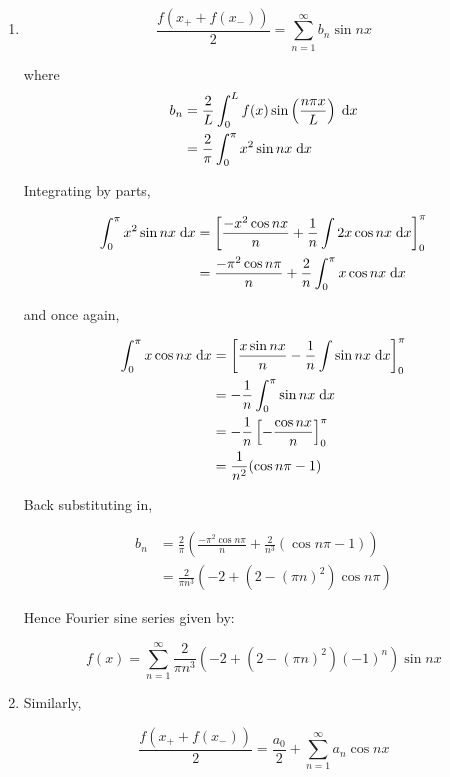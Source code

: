\documentclass[a4paper]{article}
\begin{document}
\begin{enumerate}[label = (\alph*)]
	\item \[ \frac{f(x_{+} + f(x_{-}))}{2} =  \sum_{n=1}^{\infty} b_{n} \sin  n x   \]
	
	where 
	\begin{align*}
	b_{n} & = \frac{2}{L} \int_{0}^{L} f(x) \sin \left( \frac{n \pi x}{L} \right) \; \mathrm{d} x  \\
	& = \frac{2}{\pi} \int_{0}^{\pi} x^{2} \sin n x \; \mathrm{d} x
	\end{align*}
	
	Integrating by parts,
	
	\begin{align*}
	\int_{0}^{\pi} x^{2} \sin n x \; \mathrm{d} x & = \left[  \frac{- x^{2} \cos n x }{n} + \frac{1}{n} \int 2x \cos n x \; \mathrm{d} x \right]_{0}^{\pi}  \\
	& = \frac{- \pi^{2} \cos n \pi}{n} + \frac{2}{n} \int_{0}^{\pi} x \cos n x \; \mathrm{d} x
	\end{align*}
	
	and once again,
	
	\begin{align*}
	\int_{0}^{\pi} x \cos n x \; \mathrm{d} x & =\left[ \frac{x \sin n x}{n} - \frac{1}{n} \int \sin n x \; \mathrm{d} x \right]_{0}^{\pi}  \\
	& = - \frac{1}{n} \int_{0}^{\pi} \sin n x \; \mathrm{d} x \\
	& = - \frac{1}{n} \left[ - \frac{\cos n x}{n} \right]_{0}^{\pi}\\
	& = \frac{1}{n^{2}} (\cos n \pi - 1) 
	\end{align*}
	
	Back substituting in, 
	
	\begin{align*}
	b_{n} & = \frac{2}{\pi} \left( \frac{- \pi^{2} \cos n \pi}{n} + \frac{2}{n^{3}} (\cos n \pi - 1)   \right)  \\
	& = \frac{2}{\pi n^{3}} \left(   - 2 + (2 - (\pi n)^{2} )\cos n \pi       \right) 
	\end{align*}
	
	Hence Fourier sine series given by:
	
	\[ f(x) = \sum_{n=1}^{\infty} \frac{2}{\pi n^{3}} \left(   - 2 + (2 - (\pi n)^{2} ) (-1)^{n} \right) \sin n x  \]
	
	\item Similarly,
	
	\[ \frac{f(x_{+} + f(x_{-}))}{2} =  \frac{a_{0}}{2} + \sum_{n=1}^{\infty} a_{n} \cos n x  \]
	

\end{enumerate}
\end{document}
